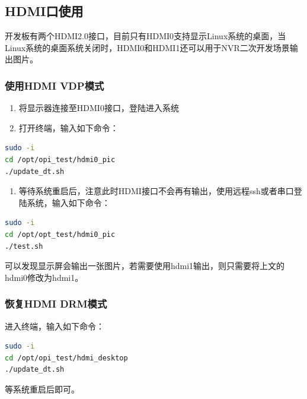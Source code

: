 \subsection{HDMI口使用}\label{hdmiux53e3ux4f7fux7528}

开发板有两个HDMI2.0接口，目前只有HDMI0支持显示Linux系统的桌面，当Linux系统的桌面系统关闭时，HDMI0和HDMI1还可以用于NVR二次开发场景输出图片。

\subsubsection{使用HDMI VDP模式}\label{ux4f7fux7528hdmi-vdpux6a21ux5f0f}

\begin{enumerate}
\def\labelenumi{\arabic{enumi}.}
\tightlist
\item
  将显示器连接至HDMI0接口，登陆进入系统
\item
  打开终端，输入如下命令：
\end{enumerate}

\begin{lstlisting}[language=bash]
sudo -i
cd /opt/opi_test/hdmi0_pic
./update_dt.sh
\end{lstlisting}

\begin{enumerate}
\def\labelenumi{\arabic{enumi}.}
\setcounter{enumi}{2}
\tightlist
\item
  等待系统重启后，注意此时HDMI接口不会再有输出，使用远程ssh或者串口登陆系统，输入如下命令：
\end{enumerate}

\begin{lstlisting}[language=bash]
sudo -i
cd /opt/opt_test/hdmi0_pic
./test.sh
\end{lstlisting}

可以发现显示屏会输出一张图片，若需要使用hdmi1输出，则只需要将上文的hdmi0修改为hdmi1。

\subsubsection{恢复HDMI DRM模式}\label{ux6062ux590dhdmi-drmux6a21ux5f0f}

进入终端，输入如下命令：

\begin{lstlisting}[language=bash]
sudo -i
cd /opt/opi_test/hdmi_desktop
./update_dt.sh
\end{lstlisting}

等系统重启后即可。

